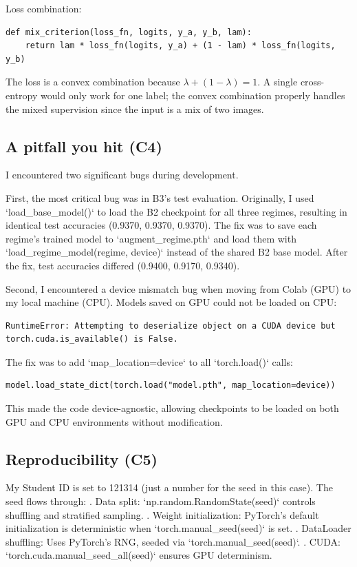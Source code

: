 \documentclass[10pt,twocolumn,letterpaper]{article}
\begin{document}
Loss combination:
\begin{lstlisting}
def mix_criterion(loss_fn, logits, y_a, y_b, lam):
    return lam * loss_fn(logits, y_a) + (1 - lam) * loss_fn(logits, y_b)
\end{lstlisting}

The loss is a convex combination because $\lambda + (1-\lambda) = 1$. A single
cross-entropy would only work for one label; the convex combination properly
handles the mixed supervision since the input is a mix of two images.

\subsection{A pitfall you hit (C4)}

I encountered two significant bugs during development.

First, the most critical bug was in B3's test evaluation. Originally, I used
`load\_base\_model()` to load the B2 checkpoint for all three regimes,
resulting in identical test accuracies (0.9370, 0.9370, 0.9370). The fix was
to save each regime's trained model to `augment\_{regime}.pth` and load them
with `load\_regime\_model(regime, device)` instead of the shared B2 base model.
After the fix, test accuracies differed (0.9400, 0.9170, 0.9340).

Second, I encountered a device mismatch bug when moving from Colab (GPU) to
my local machine (CPU). Models saved on GPU could not be loaded on CPU:
\begin{lstlisting}
RuntimeError: Attempting to deserialize object on a CUDA device but
torch.cuda.is_available() is False.
\end{lstlisting}
The fix was to add `map\_location=device` to all `torch.load()` calls:
\begin{lstlisting}
model.load_state_dict(torch.load("model.pth", map_location=device))
\end{lstlisting}
This made the code device-agnostic, allowing checkpoints to be loaded on
both GPU and CPU environments without modification.

\subsection{Reproducibility (C5)}

My Student ID is set to 121314 (just a number for the seed in this case). The seed flows through:
. Data split: `np.random.RandomState(seed)` controls shuffling and
   stratified sampling.
. Weight initialization: PyTorch's default initialization is
   deterministic when `torch.manual\_seed(seed)` is set.
. DataLoader shuffling: Uses PyTorch's RNG, seeded via
   `torch.manual\_seed(seed)`.
. CUDA: `torch.cuda.manual\_seed\_all(seed)` ensures GPU determinism.
\end{document}
